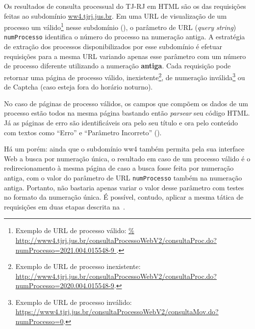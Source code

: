 \newcommand{\urlProcValido}{\url{%
    http://www4.tjrj.jus.br/consultaProcessoWebV2/consultaProc.do?numProcesso=2021.004.015548-9
}}

Os resultados de consulta processual do TJ-RJ em HTML são os das requisições
feitas ao subdomínio \url{ww4.tjrj.jus.br}. Em uma URL de visualização de um
processo um válido\footnote{Exemplo de URL de processo válido: \urlProcValido.}
nesse subdomínio (), o parâmetro de URL
(\textit{query string}) \texttt{numProcesso} identifica o número do processo na
numeração antiga. A estratégia de extração dos processos disponibilizados por
esse subdomínio é efetuar requisições para a mesma URL variando apenas esse
parâmetro com um número de processo diferente utilizando a numeração
\textbf{antiga}. Cada requisição pode retornar uma página de processo válido,
inexistente\footnote{Exemplo de URL de processo inexistente:
\url{http://www4.tjrj.jus.br/consultaProcessoWebV2/consultaProc.do?numProcesso=2020.004.015548-9}.},
de numeração inválida\footnote{Exemplo de URL de processo inválido:
\url{https://www4.tjrj.jus.br/consultaProcessoWebV2/consultaMov.do?numProcesso=0}.}
ou de Captcha (caso esteja fora do horário noturno).

No caso de páginas de processo válidos, os campos que compõem os dados de um
processo estão todos na mesma página bastando então \textit{parsear} seu código
HTML. Já as páginas de erro são identificáveis ora pelo seu título e ora pelo
conteúdo com textos como ``Erro'' e ``Parâmetro Incorreto''
().

Há um porém: ainda que o subdomínio ww4 também permita pela sua interface Web a
busca por numeração única, o resultado em caso de um processo válido é o
redirecionamento à mesma página de caso a busca fosse feita por numeração
antiga, com o valor do parâmetro de URL \texttt{numProcesso} também na
numeração antiga. Portanto, não bastaria apenas variar o valor desse parâmetro
com testes no formato da numeração única. É possível, contudo, aplicar a mesma
tática de requisições em duas etapas descrita
na~.

